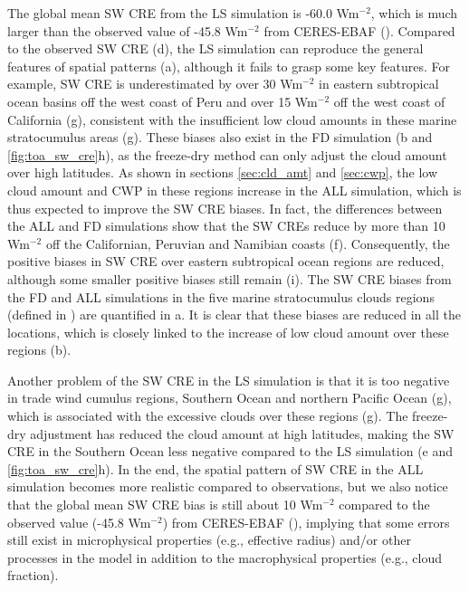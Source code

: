 The global mean SW CRE from the LS simulation is -60.0 Wm$^{-2}$, which is much larger than the observed value of -45.8 Wm$^{-2}$ from CERES-EBAF (). Compared to the observed SW CRE (d), the LS simulation can reproduce the general features of spatial patterns (a), although it fails to grasp some key features. For example, SW CRE is underestimated by over 30 Wm$^{-2}$ in eastern subtropical ocean basins off the west coast of Peru and over 15 Wm$^{-2}$ off the west coast of California (g), consistent with the insufficient low cloud amounts in these marine stratocumulus areas (g). These biases also exist in the FD simulation (b and \ref{fig:toa_sw_cre}h), as the freeze-dry method can only adjust the cloud amount over high latitudes. As shown in sections \ref{sec:cld_amt} and \ref{sec:cwp}, the low cloud amount and CWP in these regions increase in the ALL simulation, which is thus expected to improve the SW CRE biases. In fact, the differences between the ALL and FD simulations show that the SW CREs reduce by more than 10 Wm$^{-2}$ off the Californian, Peruvian and Namibian coasts (f). Consequently, the positive biases in SW CRE over eastern subtropical ocean regions are reduced, although some smaller positive biases still remain (i). The SW CRE biases from the FD and ALL simulations in the five marine stratocumulus clouds regions (defined in ) are quantified in a. It is clear that these biases are reduced in all the locations, which is closely linked to the increase of low cloud amount over these regions (b).

Another problem of the SW CRE in the LS simulation is that it is too negative in trade wind cumulus regions, Southern Ocean and northern Pacific Ocean (g), which is associated with the excessive clouds over these regions (g). The freeze-dry adjustment has reduced the cloud amount at high latitudes, making the SW CRE in the Southern Ocean less negative compared to the LS simulation (e and \ref{fig:toa_sw_cre}h). In the end, the spatial pattern of SW CRE in the ALL simulation becomes more realistic compared to observations, but we also notice that the global mean SW CRE bias is still about 10 Wm$^{-2}$ compared to the observed value (-45.8 Wm$^{-2}$) from CERES-EBAF (), implying that some errors still exist in microphysical properties (e.g., effective radius) and/or other processes in the model in addition to the macrophysical properties (e.g., cloud fraction).

